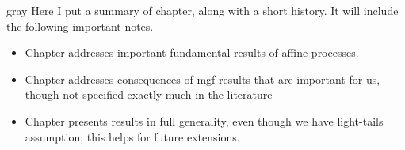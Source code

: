 \begin{color}{gray}
  Here I put a summary of chapter, along with a short history.
  It will include the following important notes.
  \begin{itemize}
    \item
      Chapter addresses important fundamental results of affine processes.
    \item
      Chapter addresses consequences of mgf results that are important for us, though not specified exactly much in the literature
    \item
      Chapter presents results in full generality, even though we have light-tails assumption; this helps for future extensions.
  \end{itemize}
\end{color}
